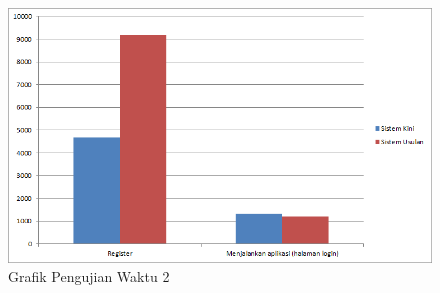 \begin{figure}[htbp]
	\centering
		\includegraphics[scale=0.7]{Gambar/5_pengujianwaktu_2.png}
	\caption{Grafik Pengujian Waktu 2} 
	\label{fig:5_pengujianwaktu_2}
\end{figure}

